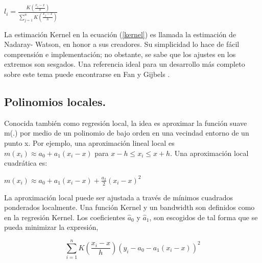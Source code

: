 \vspace*{0.2 cm}

\begin{center}
$\displaystyle{l_{i} = \frac{K(\frac{x_{i}-x}{h})}{\sum_{j=1}^{n} K(\frac{x_{j}-x}{h})} }$
\end{center}

\vspace*{0.2 cm}


\hspace*{0.4 cm} La estimaci\'on Kernel en la ecuaci\'on (\ref{kernel}) es llamada la estimaci\'on de Nadaray- Watson, en honor a sus creadores. Su simplicidad lo hace de f\'acil comprensi\'on e implementaci\'on; no obstante, se sabe que los ajustes en los extremos son sesgados. Una referencia ideal para un desarrollo m\'as completo sobre este tema puede encontrarse en Fan y Gijbels \cite{FG}.

\subsection{Polinomios locales.\\}



\hspace*{0.4 cm} Conocida tambi\'en como regresi\'on local, la idea es aproximar la funci\'on suave m(.) por medio de un polinomio de bajo orden en una vecindad entorno de un punto x. Por ejemplo, una aproximaci\'on lineal local es $m(x_{i}) \approx a_{0} + a_{1}(x_{i}-x)$ para $x - h \leq x_{i} \leq x+h$. Una aproximaci\'on local cuadr\'atica es:

\vspace*{0.2 cm}

\begin{center}
$\displaystyle{m(x_{i}) \approx  a_{0} + a_{1}(x_{i}-x) + \frac{a_{2}}{2}(x_{i}-x)^2}$
\end{center}

\vspace*{0.2 cm}

\hspace*{0.4 cm} La aproximaci\'on local puede ser ajustada a trav\'es de m\'inimos cuadrados ponderados localmente. Una funci\'on Kernel y un bandwidth son definidos como en la regresi\'on Kernel. Los coeficientes $\hat{a}_{0}$ y $\hat{a}_{1}$, son escogidos de tal forma que se pueda minimizar la expresi\'on,

\vspace*{0.2 cm}

\begin{equation}
 \sum_{i=1}^{n} K(\frac{x_{i}-x}{h}) (y_{i}-a_{0}-a_{1}(x_{i}-x))^2 
 \label{kernel2}
\end{equation}

